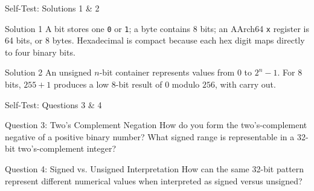 \documentclass[aspectratio=169,11pt,t]{beamer}
\newcommand{\code}[1]{\texttt{#1}}
\begin{document}





\begin{frame}{Self-Test: Solutions 1 \& 2}
\begin{block}{Solution 1}
A bit stores one \code{0} or \code{1}; a byte contains 8 bits; an AArch64 \code{x} register is 64 bits, or 8 bytes.
Hexadecimal is compact because each hex digit maps directly to four binary bits.
\end{block}
\vspace{0.3em}
\begin{block}{Solution 2}
An unsigned $n$-bit container represents values from $0$ to $2^n - 1$.
For 8 bits, $255 + 1$ produces a low 8-bit result of $0$ modulo $256$, with carry out.
\end{block}
\end{frame}






\begin{frame}{Self-Test: Questions 3 \& 4}
\begin{block}{Question 3: Two's Complement Negation}
How do you form the two's-complement negative of a positive binary number?
What signed range is representable in a 32-bit two's-complement integer?
\end{block}
\vspace{0.4em}
\begin{block}{Question 4: Signed vs. Unsigned Interpretation}
How can the same 32-bit pattern represent different numerical values when interpreted as signed versus unsigned?
\end{block}
\end{frame}





\end{document}
